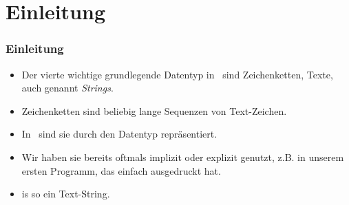 \documentclass[aspectratio=169,mathserif,notheorems]{beamer}%
\subtitle{11.~Der Datentyp str}%
\begin{document}
%
%
\startPresentation%
%
\section{Einleitung}%
\begin{frame}%
\frametitle{Einleitung}%
\begin{itemize}%
\item Der vierte wichtige grundlegende Datentyp in \python\ sind Zeichenketten, Texte, auch genannt \emph{Strings}.\cite{PSF:P3D:TPSL:TSTS}%
\item<2-> Zeichenketten sind beliebig lange Sequenzen von Text-Zeichen.%
\item<3-> In \python\ sind sie durch den Datentyp  repräsentiert.%
\item<4-> Wir haben sie bereits oftmals implizit oder explizit genutzt, z.B. in unserem ersten Programm, das einfach  ausgedruckt hat.%
\item<5->  is so ein Text-String.%
\end{itemize}%
\end{frame}%
%
%
\end{document}
